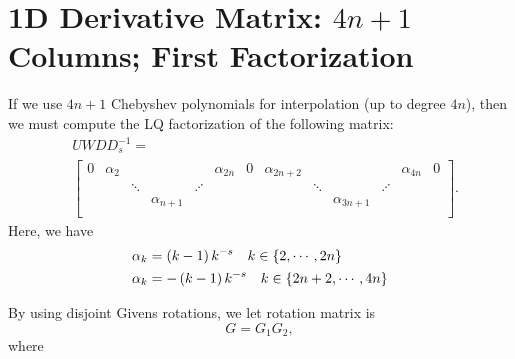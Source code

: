 \section{1D \CV{} Derivative Matrix: $4n+1$ Columns; First Factorization}
\label{sec:CV_D_1D_4n}

If we use $4n+1$ Chebyshev polynomials for interpolation (up to degree $4n$),
then we must compute the LQ factorization of the following matrix:
%
\begin{align}
    &UWDD_{s}^{-1} = \nonumber\\
    &\begin{bmatrix}
        0 & \alpha_{2} & & & & \alpha_{2n} & 0 & \alpha_{2n+2} & &
          & & \alpha_{4n} & 0 \\
          & & \ddots & & \iddots & & & & \ddots & & \iddots & & \\
          & & & \alpha_{n+1} & & & & & & \alpha_{3n+1} & & & \\
        \end{bmatrix}.
\end{align}
%
Here, we have
%
\begin{align}
    \alpha_{k} &= \left( k-1 \right)k^{-s} \quad k\in\left\{ 2,\cdots,2n \right\} \nonumber\\
    \alpha_{k} &= -\left( k-1 \right)k^{-s} \quad k\in\left\{ 2n+2,\cdots,4n \right\}
\end{align}

By using disjoint Givens rotations, we let rotation matrix is
%
\begin{equation}
    G = G_{1}G_{2},
\end{equation}
%
where

